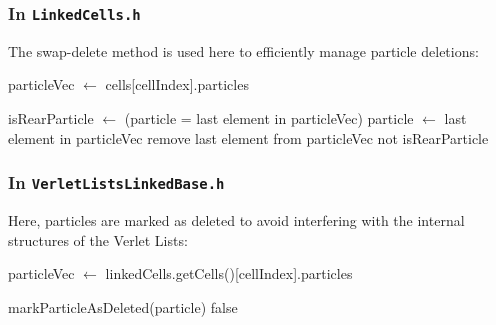 \subsubsection{In \texttt{LinkedCells.h}}
The swap-delete method is used here to efficiently manage particle deletions:
\begin{algorithm}
  \label{alg:deleteParticle}
  \begin{algorithmic}[1]
      \State particleVec $\gets$ cells[cellIndex].particles
      
              \State isRearParticle $\gets$ (particle = last element in particleVec)
              \State particle $\gets$ last element in particleVec
              \State remove last element from particleVec
              \State \Return not isRearParticle
          \EndIf
      \EndFor
  \EndProcedure
  \end{algorithmic}
\end{algorithm}






\subsubsection{In \texttt{VerletListsLinkedBase.h}}
Here, particles are marked as deleted to avoid interfering with the internal structures of the Verlet Lists:
\begin{algorithm}
  \label{alg:deleteParticleMark}
  \begin{algorithmic}[1]
      \State particleVec $\gets$ linkedCells.getCells()[cellIndex].particles
      
              \State markParticleAsDeleted(particle)
              \State \Return false
          \EndIf
      \EndFor
  \EndProcedure
  \end{algorithmic}
\end{algorithm}


